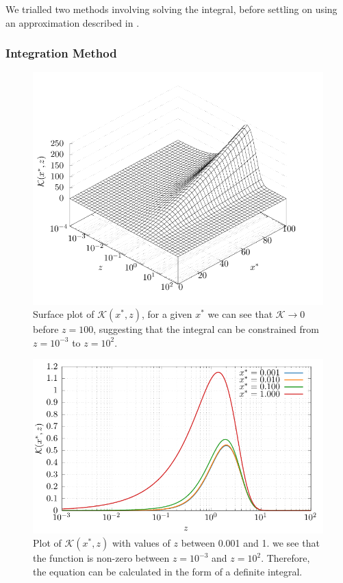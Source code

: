 We trialled two methods involving solving the integral, before settling on using an approximation described in \textcite{dwek_infrared_1981}.

\subsubsection{Integration Method}

\begin{figure}[ht]
  \centering
  \includegraphics{assets/integral/func_xe_3d.pdf}
  \caption[3D plot of $\mathcal{K}(x^*,z)$]{Surface plot of $\mathcal{K}(x^*,z)$, for a given $x^*$ we can see that $\mathcal{K} \rightarrow 0$ before $z = 100$, suggesting that the integral can be constrained from $z=10^{-3}$ to $z=10^2$.}
  \label{fig:constrainplot3d}
\end{figure}

\begin{figure}[ht]
  \centering
  \includegraphics{assets/integral/func_xe_plot.pdf}
  \caption[Plot of $\mathcal{K}(x^*,z)$ for discrete values of $z$]{Plot of $\mathcal{K}(x^*,z)$ with values of $z$ between 0.001 and 1. we see that the function is non-zero between $z=10^{-3}$ and $z=10^2$. Therefore, the equation can be calculated in the form of a definite integral.}
  \label{fig:constrainplot2d}
\end{figure}

